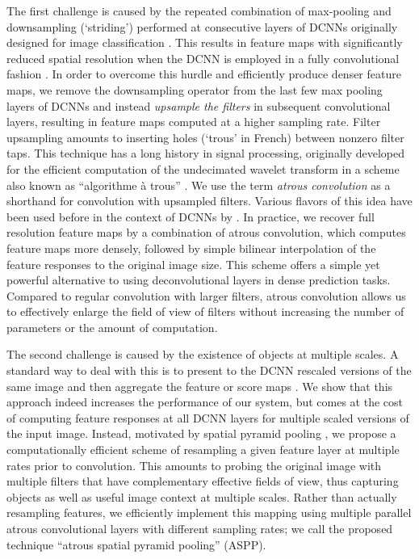 The first challenge is caused by the repeated combination of max-pooling and downsampling (`striding')
 performed at consecutive layers of  DCNNs originally designed
for image classification \cite{KrizhevskyNIPS2013, simonyan2014very, szegedy2014going}.
This results in feature maps with significantly reduced spatial resolution when
the DCNN is employed in a fully convolutional fashion \cite{long2014fully}. In
order to overcome this hurdle and efficiently produce denser feature maps, we
remove the downsampling operator from the last few max pooling layers of DCNNs
and instead {\it upsample the filters} in subsequent convolutional layers, resulting
in feature maps computed at a higher sampling rate. Filter upsampling amounts to
inserting holes (`trous' in French) between nonzero filter taps. This technique has a long history in signal processing,
originally developed for the efficient computation of the undecimated wavelet
transform in a scheme also known as ``algorithme \`a trous''
\cite{holschneider1989real}. We use the term \emph{atrous convolution} as a shorthand for convolution with
upsampled filters. 
Various flavors of this idea have been used before
in the context of DCNNs by \cite{giusti2013fast, sermanet2013overfeat,
papandreou2014untangling}. In practice, we recover full resolution feature maps
by a combination of atrous convolution, which computes feature maps more
densely, followed by simple bilinear interpolation of the feature responses to
the original image size. This scheme offers a simple yet powerful alternative to
using deconvolutional layers \cite{zeiler2014visualizing, long2014fully} in
dense prediction tasks. Compared to regular convolution with larger filters, atrous
convolution allows us to effectively enlarge the field of view of filters without
increasing the number of parameters or the amount of computation.

The second challenge is caused by the existence of objects at
multiple scales. A standard way to deal with this is to present to the DCNN
rescaled versions of the same image and then aggregate the feature or score maps
\cite{papandreou2014untangling, chen2015attention,kokkinos2016pushing}. We show that this approach
indeed increases the performance of our system, but comes at the cost of computing feature
responses at all DCNN layers for multiple scaled versions of the input image. Instead, motivated
by  spatial pyramid pooling \cite{lazebnik2006beyond, he2014spatial},
we propose a computationally efficient scheme of resampling a given feature layer at multiple
rates prior to  convolution. This amounts to probing the original image with multiple filters
that have complementary effective fields of view, thus capturing objects as
well as useful image context at multiple scales. Rather than actually resampling features, 
we efficiently implement this mapping using
multiple parallel atrous convolutional layers with different sampling
rates; we call the proposed technique ``atrous spatial pyramid pooling'' (ASPP).


